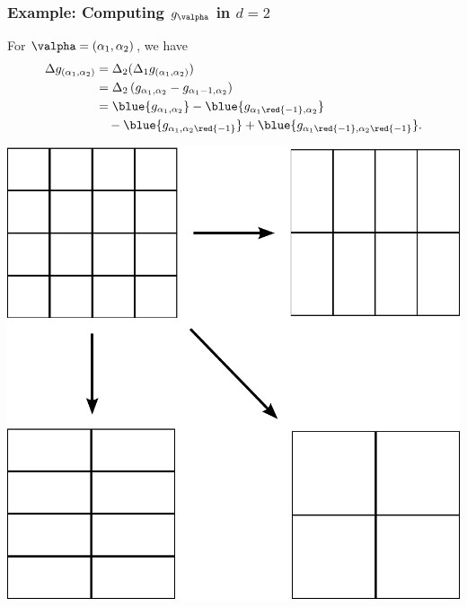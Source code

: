 \begin{frame}\frametitle{Example: Computing $g_\valpha$ in $d=2$}
    \begin{minipage}[b]{0.6\linewidth}
For $\valpha = (\alpha_1,\alpha_2)$, we have
  \begin{align*}
    \Delta g_{(\alpha_1,\alpha_2)} &= \Delta_2 (\Delta_1 g_{(\alpha_1,\alpha_2)})\\
    &= \Delta_2 \left( g_{\alpha_1,\alpha_2} - g_{\alpha_1-1,\alpha_2} \right) \\
    &=  \blue{g_{\alpha_1,\alpha_2}} - \blue{g_{\alpha_1\red{-1},\alpha_2}} \\
    &\quad - \blue{g_{\alpha_1,\alpha_2\red{-1}}} + \blue{g_{\alpha_1\red{-1},\alpha_2\red{-1}}}.
  \end{align*}

\vspace{1.5cm}
\phantom{a}
\end{minipage}
\hspace{0.375cm}
\begin{minipage}[b]{0.3\linewidth}
\begin{center}
    \def\svgwidth{3cm} 
\vskip 0.2cm
  \includegraphics[scale=0.25]{src/imgs/mesh_mimc}
  \end{center}
\end{minipage}
\end{frame}

